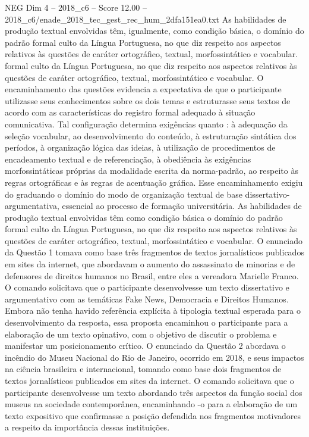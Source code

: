 \begin{textsample}{NEG Dim 4 – 2018\_c6 – Score 12.00 – 2018\_c6/enade\_2018\_tec\_gest\_rec\_hum\_2dfa151ea0.txt}
As habilidades de produção textual envolvidas têm, igualmente, como condição básica, o domínio do padrão formal culto da Língua Portuguesa, no que diz respeito aos aspectos relativos às questões de caráter ortográfico, textual, morfossintático e vocabular. formal culto da Língua Portuguesa, no que diz respeito aos aspectos relativos às questões de caráter ortográfico, textual, morfossintático e vocabular.
O encaminhamento das questões evidencia a expectativa de que o participante utilizasse seus conhecimentos sobre os dois temas e estruturasse seus textos de acordo com as características do registro formal adequado à situação comunicativa.
Tal configuração determina exigências quanto : à adequação da seleção vocabular, ao desenvolvimento do conteúdo, à estruturação sintática dos períodos, à organização lógica das ideias, à utilização de procedimentos de encadeamento textual e de referenciação, à obediência às exigências morfossintáticas próprias da modalidade escrita da norma-padrão, ao respeito às regras ortográficas e às regras de acentuação gráfica.
Esse encaminhamento exigiu do graduando o domínio do modo de organização textual de base dissertativo-argumentativa, essencial ao processo de formação universitária.
As habilidades de produção textual envolvidas têm como condição básica o domínio do padrão formal culto da Língua Portuguesa, no que diz respeito aos aspectos relativos às questões de caráter ortográfico, textual, morfossintático e vocabular.
O enunciado da Questão 1 tomava como base três fragmentos de textos jornalísticos publicados em sites da internet, que abordavam o aumento do assassinato de minorias e de defensores de direitos humanos no Brasil, entre eles a vereadora Marielle Franco.
O comando solicitava que o participante desenvolvesse um texto dissertativo e argumentativo com as temáticas Fake News, Democracia e Direitos Humanos.
Embora não tenha havido referência explícita à tipologia textual esperada para o desenvolvimento da resposta, essa proposta encaminhou o participante para a elaboração de um texto opinativo, com o objetivo de discutir o problema e manifestar um posicionamento crítico.
O enunciado da Questão 2 abordava o incêndio do Museu Nacional do Rio de Janeiro, ocorrido em 2018, e seus impactos na ciência brasileira e internacional, tomando como base dois fragmentos de textos jornalísticos publicados em sites da internet.
O comando solicitava que o participante desenvolvesse um texto abordando três aspectos da função social dos museus na sociedade contemporânea, encaminhando -o para a elaboração de um texto expositivo que confirmasse a posição defendida nos fragmentos motivadores a respeito da importância dessas instituições.

\end{textsample}
